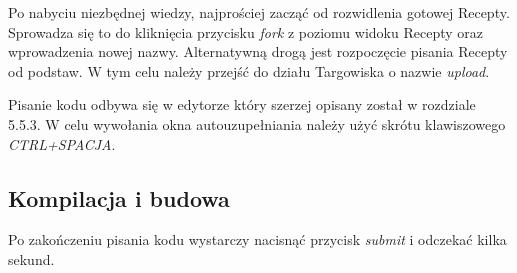 \documentclass[11pt,a4paper,polish,thesis]{dcsbook}
\begin{document}
Po nabyciu niezbędnej wiedzy, najprościej zacząć od rozwidlenia gotowej Recepty. Sprowadza się to do kliknięcia przycisku \emph{fork} z poziomu widoku Recepty oraz
wprowadzenia nowej nazwy. Alternatywną drogą jest rozpoczęcie pisania Recepty od podstaw. W tym celu należy przejść do działu Targowiska o nazwie \emph{upload}.

Pisanie kodu odbywa się w edytorze który szerzej opisany został w rozdziale 5.5.3. W celu wywołania okna autouzupełniania należy użyć skrótu klawiszowego
\emph{CTRL+SPACJA}.
\subsection{Kompilacja i budowa}
Po zakończeniu pisania kodu wystarczy nacisnąć przycisk \emph{submit} i odczekać kilka sekund.
\end{document}

